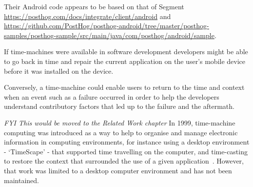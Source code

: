 Their Android code appears to be based on that of Segment \url{https://posthog.com/docs/integrate/client/android} and \url{https://github.com/PostHog/posthog-android/tree/master/posthog-samples/posthog-sample/src/main/java/com/posthog/android/sample}.

If time-machines were available in software development developers might be able to go back in time and repair the current application on the user's mobile device before it was installed on the device. 

Conversely, a time-machine could enable users to return to the time and context when an event such as a failure occurred in order to help the developers understand contributory factors that led up to the failure and the aftermath. 

\textit{FYI This would be moved to the Related Work chapter}
In 1999, time-machine computing was introduced as a way to help to organise and manage electronic information in computing environments, for instance using a desktop environment - `TimeScape' - that supported time travelling on the computer, and time-casting to restore the context that surrounded the use of a given application~\citep{rekimoto1999_time_machine_computing}. However, that work was limited to a desktop computer environment and has not been maintained. 
